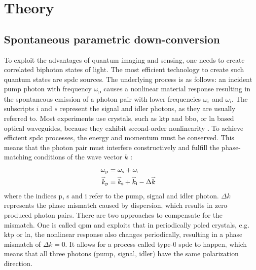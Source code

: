 \section{Theory}
\subsection{Spontaneous parametric down-conversion }
To exploit the advantages of quantum imaging and sensing, one needs to create correlated biphoton states of light. The most efficient technology to create such quantum states are \acrfull{spdc} sources. \newline
The underlying process is as follows: an incident pump photon with frequency $\omega_{\text{p}}$ causes a nonlinear material response resulting in the spontaneous emission of a photon pair with lower frequencies $\omega_{\text{s}}$ and $\omega_{\text{i}}$. The subscripts $i$ and $s$ represent the signal and idler photons, as they are usually referred to. \newline
Most experiments use crystals, such as \acrfull{ktp} and \acrfull{bbo}, or \acrfull{ln} based optical waveguides, because they exhibit second-order nonlinearity \cite{fiorentinoSpontaneousParametricDownconversion2007,kwiatUltrabrightSourcePolarizationentangled1999,tanzilliHighlyEfficientPhotonpair2000}.
To achieve efficient \acrshort{spdc} processes, the energy and momentum must be conserved. This means that the photon pair must interfere constructively and fulfill the phase-matching conditions of the wave vector $k$ \cite{gilabertebassetPerspectivesApplicationsQuantum2019} : 
\begin{equation}
	\begin{aligned}
		\omega_{\text{p}} &= \omega_{\text{s}} + \omega_{\text{i}} \\
		\accentset{\rightharpoonup}{k}_{\text{p}} &= \accentset{\rightharpoonup}{k}_{\text{s}} + \accentset{\rightharpoonup}{k}_{\text{i}} - \Delta \accentset{\rightharpoonup}{k}
	\end{aligned}
\end{equation}
where the indices p, s and i refer to the pump, signal and idler photon. $\Delta k$ represents the phase mismatch caused by dispersion, which results in zero produced photon pairs. There are two approaches to compensate for the mismatch. \newline
One is called \acrfull{qpm} and exploits that in periodically poled crystals, e.g. \acrshort{ktp} or \acrshort{ln}, the nonlinear response also changes periodically, resulting in a phase mismatch of $\Delta k = 0$. It allows for a process called type-0 \acrshort{spdc} to happen, which means that all three photons (pump, signal, idler) have the same polarization direction. \newline
